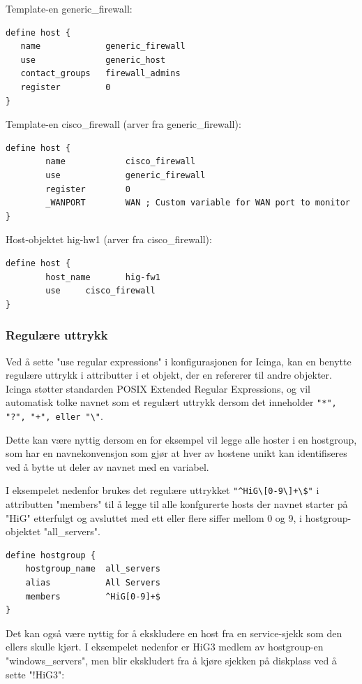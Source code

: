 Template-en generic\_firewall:

\begin{lstlisting}
define host {
   name             generic_firewall
   use              generic_host
   contact_groups   firewall_admins
   register         0
}
\end{lstlisting}

Template-en cisco\_firewall (arver fra generic\_firewall):

\begin{lstlisting}
define host {
        name            cisco_firewall
        use             generic_firewall
        register        0
        _WANPORT        WAN ; Custom variable for WAN port to monitor
}
\end{lstlisting}

Host-objektet hig-hw1 (arver fra cisco\_firewall):

\begin{lstlisting}
define host {
        host_name       hig-fw1
        use		cisco_firewall
}
\end{lstlisting}

\subsubsection{Regulære uttrykk}
Ved å sette "use regular expressions" i konfigurasjonen for Icinga, kan en benytte regulære uttrykk i attributter i et objekt, der en refererer til andre objekter. Icinga støtter standarden POSIX Extended Regular Expressions, og vil automatisk tolke navnet som et regulært uttrykk dersom det inneholder \verb|"*", "?", "+", eller "\"|.

Dette kan være nyttig dersom en for eksempel vil legge alle hoster i en hostgroup, som har en navnekonvensjon som gjør at hver av hostene unikt kan identifiseres ved å bytte ut deler av navnet med en variabel.

I eksempelet nedenfor brukes det regulære uttrykket \verb|"^HiG\[0-9\]+\$"| i attributten "members" til å legge til alle konfgurerte hosts der navnet starter på "HiG" etterfulgt og avsluttet med ett eller flere siffer mellom 0 og 9, i hostgroup-objektet "all\_servers".

\begin{lstlisting}
define hostgroup {
	hostgroup_name	all_servers
	alias           All Servers
	members         ^HiG[0-9]+$
}
\end{lstlisting}

Det kan også være nyttig for å ekskludere en host fra en service-sjekk som den ellers skulle kjørt. I eksempelet nedenfor er HiG3 medlem av hostgroup-en "windows\_servers", men blir ekskludert fra å kjøre sjekken på diskplass ved å sette "!HiG3":


